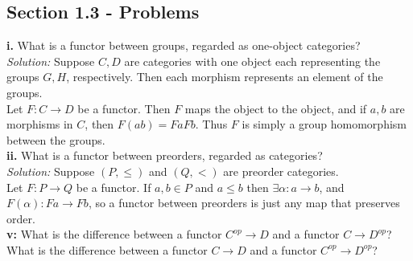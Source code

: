 \documentclass[a4paper]{article}
\theoremstyle{plain}%
\theoremstyle{definition}
\theoremstyle{remark}
\begin{document}
 


\subsection*{Section 1.3 - Problems}
\textbf{i.} What is a functor between groups, regarded as one-object
categories?\\
\linebreak
\textit{Solution:} 
Suppose $C, D$ are categories with one object each representing the groups
$G,H$, respectively. Then each morphism
represents an element of the groups.\\
Let $F  \colon C \to D$ be a functor. Then
$F$ maps the object to the object, and if $a,b$ are morphisms in $C$, then
$F \left( a b \right) = Fa Fb$. Thus $F$ is simply a group homomorphism between the
groups.\\
\linebreak
\textbf{ii.} What is a functor between preorders, regarded as categories?\\
\linebreak
\textit{Solution:} Suppose
$(P, \le )$ and $(Q,<)$ are preorder categories.\\
Let $F  \colon P \to Q$ be a functor. 
If $a,b \in P$ and $a \le b$ then $\exists \alpha  \colon a \to b$, and
$F(\alpha)  \colon Fa \to Fb$, so a functor between preorders is just any map
that preserves order.\\
\linebreak
\textbf{v:} What is the difference between a functor $C^{op} \to D$ and
a functor
$C \to D^{op}$? What is the difference between a functor $C \to D$ and
a functor
$C^{op} \to D^{op}$?\\
\linebreak
\end{document}
